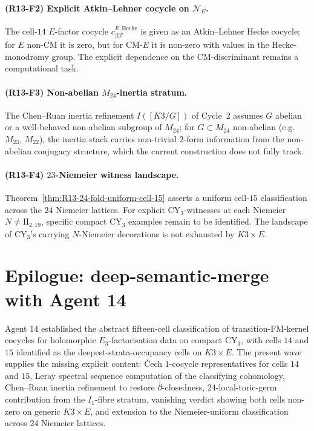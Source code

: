 \documentclass[11pt]{amsart}
\providecommand{\cN}{\mathcal{N}}
\begin{document}
\paragraph{(R13-F2) Explicit Atkin--Lehner cocycle on $\cN_E$.} The
cell-$14$ $E$-factor cocycle $c^{E, \mathrm{Hecke}}_{\beta \beta'}$ is
given as an Atkin--Lehner Hecke cocycle; for $E$ non-CM it is zero,
but for CM-$E$ it is non-zero with values in the Hecke-monodromy
group. The explicit dependence on the CM-discriminant remains a
computational task.

\paragraph{(R13-F3) Non-abelian $M_{24}$-inertia stratum.} The
Chen--Ruan inertia refinement $I([K3/G])$ of Cycle~$2$ assumes
$G$ abelian or a well-behaved non-abelian subgroup of $M_{24}$;
for $G \subset M_{24}$ non-abelian (e.g.\ $M_{23}$, $M_{22}$), the
inertia stack carries non-trivial $2$-form information from the
non-abelian conjugacy structure, which the current construction does
not fully track.

\paragraph{(R13-F4) $23$-Niemeier witness landscape.} Theorem~\ref{thm:R13-24-fold-uniform-cell-15}
asserts a uniform cell-$15$ classification across the $24$ Niemeier
lattices. For explicit CY$_3$-witnesses at each Niemeier $N \neq
\mathrm{II}_{2,19}$, specific compact CY$_3$ examples remain to be
identified. The landscape of CY$_3$'s carrying $N$-Niemeier
decorations is not exhausted by $K3 \times E$.

\section*{Epilogue: deep-semantic-merge with Agent 14}

Agent 14 established the abstract fifteen-cell classification of
transition-FM-kernel cocycles for holomorphic $E_3$-factorisation
data on compact CY$_3$, with cells $14$ and $15$ identified as the
deepest-strata-occupancy cells on $K3 \times E$. The present wave
supplies the missing explicit content: \v{C}ech $1$-cocycle
representatives for cells $14$ and $15$, Leray spectral sequence
computation of the classifying cohomology, Chen--Ruan inertia
refinement to restore $\bar\partial$-closedness, $24$-local-toric-germ
contribution from the $I_1$-fibre stratum, vanishing verdict showing
both cells non-zero on generic $K3 \times E$, and extension to the
Niemeier-uniform classification across $24$ Niemeier lattices.
\end{document}
